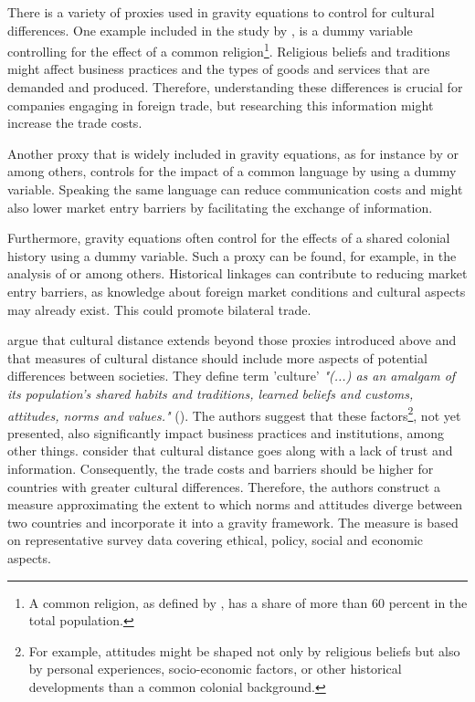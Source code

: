 There is a variety of proxies used in gravity equations to control for cultural differences. One example included in the study by \textcite{SANTANAGALLEGO20161026}, is a dummy variable controlling for the effect of a common religion\footnote{A common religion, as defined by \textcite{SANTANAGALLEGO20161026}, has a share of more than 60 percent in the total population.}. Religious beliefs and traditions might affect business practices and the types of goods and services that are demanded and produced. Therefore, understanding these differences is crucial for companies engaging in foreign trade, but researching this information might increase the trade costs. 

Another proxy that is widely included in gravity equations, as for instance by \textcite{Kimura2006} or \textcite{Nordas2017} among others, controls for the impact of a common language by using a dummy variable. Speaking the same language can reduce communication costs and might also lower market entry barriers by facilitating the exchange of information.

Furthermore, gravity equations often control for the effects of a shared colonial history using a dummy variable. Such a proxy can be found, for example, in the analysis of \textcite{Nordas2017} or \textcite{DAS2023106246} among others. Historical linkages can contribute to reducing market entry barriers, as knowledge about foreign market conditions and cultural aspects may already exist. This could promote bilateral trade. 

\textcite{Tadesse2010} argue that cultural distance extends beyond those proxies introduced above and that measures of cultural distance should include more aspects of potential differences between societies. They define term 'culture' \textit{"(...) as an amalgam of its population's shared habits and traditions, learned beliefs and customs, attitudes, norms and values."} (\cite{Tadesse2010}). The authors suggest that these factors\footnote{For example, attitudes might be shaped not only by religious beliefs but also by personal experiences, socio-economic factors, or other historical developments than a common colonial background.}, not yet presented, also significantly impact business practices and institutions, among other things. \textcite{Tadesse2010} consider that cultural distance goes along with a lack of trust and information. Consequently, the trade costs and barriers should be higher for countries with greater cultural differences. Therefore, the authors construct a measure approximating the extent to which norms and attitudes diverge between two countries and incorporate it into a gravity framework. The measure is based on representative survey data covering ethical, policy, social and economic aspects.  

